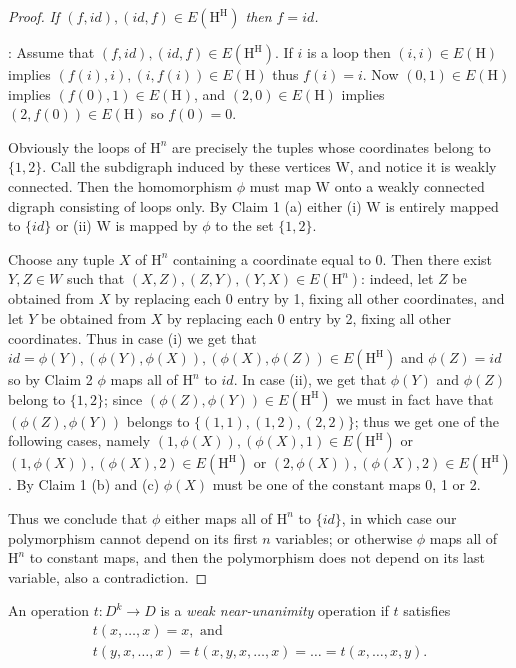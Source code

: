 \documentclass[a4paper,12pt]{article}
\theoremstyle{remark}
\newcommand{\W}{\ensuremath{\mathrm{W}}}
\renewcommand{\H}{\ensuremath{\mathrm{H}}}
\begin{document}
\begin{proof}
 {\em If $(f,id),(id,f) \in E(\H^\H)$ then $f = id$. }

: Assume that $(f,id),(id,f) \in E(\H^\H)$. If $i$ is a loop then $(i,i)\in E(\H)$ implies $(f(i),i),(i,f(i))\in E(\H)$  thus $f(i) = i$. Now $(0,1)\in E(\H)$ implies $(f(0),1)\in E(\H)$, and $(2,0)\in E(\H)$ implies $(2,f(0))\in E(\H)$ so $f(0)=0$. 


Obviously the loops of $\H^n$ are precisely the tuples whose coordinates belong to $\{1,2\}$. Call the subdigraph induced by these vertices $\W$, and notice it is weakly connected. Then the homomorphism $\phi$ must map $\W$  onto a weakly connected digraph consisting of loops only. By Claim 1 (a) either  (i) $\W$ is entirely mapped to $\{id\}$ or (ii) $\W$ is mapped by $\phi$ to the set $\{1,2\}$.

Choose any tuple $X$ of $\H^n$ containing a coordinate equal to 0. Then there exist $Y, Z \in W$ such that $(X,Z), (Z,Y), (Y,X) \in E(\H^n)$: indeed, let $Z$ be obtained from $X$ by replacing each  0 entry by 1, fixing all other coordinates, and let $Y$ be obtained from $X$ by replacing each 0 entry by 2, fixing all other coordinates. Thus in case (i) we get that $id = \phi(Y), (\phi(Y),\phi(X)),(\phi(X),\phi(Z)) \in E(\H^\H)$ and $\phi(Z)=id$ so by Claim 2 $\phi$ maps all of $\H^n$ to $id$. In case (ii), we get that $\phi(Y)$ and $\phi(Z)$ belong to $\{1,2\}$; since $(\phi(Z),\phi(Y))\in E(\H^\H)$ we must in fact have that $(\phi(Z),\phi(Y))$ belongs to $\{(1,1),(1,2),(2,2)\}$; thus we get one of the following cases, namely $(1,\phi(X)),(\phi(X),1) \in E(\H^\H)$ or $(1,\phi(X)),(\phi(X),2) \in E(\H^\H)$ or $(2,\phi(X)),(\phi(X),2) \in E(\H^\H)$. By Claim 1 (b) and (c)  $\phi(X)$ must be one of the constant maps 0, 1 or 2. 

Thus we conclude that $\phi$ either maps all of $\H^n$ to $\{id\}$, in which case our polymorphism cannot depend on its first $n$ variables; or otherwise $\phi$ maps all of $\H^n$ to constant maps, and then the polymorphism does not depend on its last variable, also a contradiction.  

\end{proof}
\noindent An operation $t:D^k \rightarrow D$ is a {\em weak near-unanimity} operation if $t$ satisfies
\[
\begin{array}{c} 
t(x,\ldots,x)=x, \mbox{ and} \\
t(y,x,\dots,x)=t(x,y,x,\dots,x)=\dots=t(x,\dots,x,y).
\end{array}
\]
\end{document}
